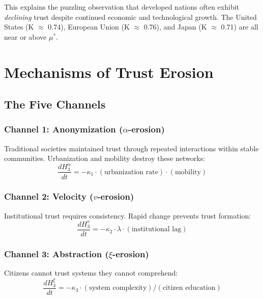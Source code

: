 \documentclass[11pt,a4paper]{article}
\begin{document}
This explains the puzzling observation that developed nations often exhibit \textit{declining} trust despite continued economic and technological growth. The United States (K $\approx$ 0.74), European Union (K $\approx$ 0.76), and Japan (K $\approx$ 0.71) are all near or above $\mu^*$.

\section{Mechanisms of Trust Erosion}

\subsection{The Five Channels}

\subsubsection{Channel 1: Anonymization ($\alpha$-erosion)}
Traditional societies maintained trust through repeated interactions within stable communities. Urbanization and mobility destroy these networks:
\begin{equation}
\frac{dH_3^{\alpha}}{dt} = -\kappa_1 \cdot (\text{urbanization rate}) \cdot (\text{mobility})
\end{equation}

\subsubsection{Channel 2: Velocity ($v$-erosion)}
Institutional trust requires consistency. Rapid change prevents trust formation:
\begin{equation}
\frac{dH_3^{v}}{dt} = -\kappa_2 \cdot \lambda \cdot (\text{institutional lag})
\end{equation}

\subsubsection{Channel 3: Abstraction ($\xi$-erosion)}
Citizens cannot trust systems they cannot comprehend:
\begin{equation}
\frac{dH_3^{\xi}}{dt} = -\kappa_3 \cdot (\text{system complexity}) / (\text{citizen education})
\end{equation}
\end{document}
